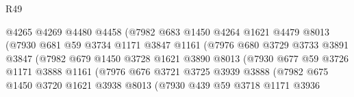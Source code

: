 \begin{lexlean}{R49}
\begin{coremodule}
                                @4265
                                @4269
                                @4480
                                @4458
                                (@7982
                                  @683
                                  @1450
                                  @4264
                                  @1621
                                  @4479
                                  @8013
                                  (@7930
                                    @681
                                    @59
                                    @3734
                                    @1171
                                    @3847
                                    @1161
                                    (@7976
                                      @680
                                      @3729
                                      @3733
                                      @3891
                                      @3847
                                      (@7982
                                        @679
                                        @1450
                                        @3728
                                        @1621
                                        @3890
                                        @8013
                                        (@7930
                                          @677
                                          @59
                                          @3726
                                          @1171
                                          @3888
                                          @1161
                                          (@7976
                                            @676
                                            @3721
                                            @3725
                                            @3939
                                            @3888
                                            (@7982
                                              @675
                                              @1450
                                              @3720
                                              @1621
                                              @3938
                                              @8013
                                              (@7930
                                                @439
                                                @59
                                                @3718
                                                @1171
                                                @3936

\end{coremodule}
\end{lexlean}
